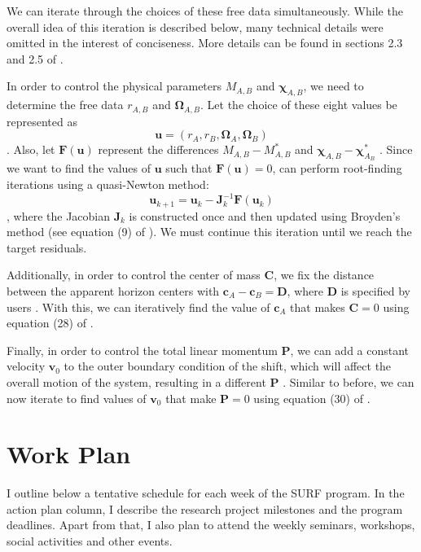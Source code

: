 \documentclass{../letter}
\renewcommand{\v}[1]{\boldsymbol{#1}}
\begin{document}
	We can iterate through the choices of these free data simultaneously. While the overall idea of this iteration is described below, many technical details were omitted in the interest of conciseness. More details can be found in sections 2.3 and 2.5 of \cite{Serguei}.

	In order to control the physical parameters $M_{A,B}$ and $\v\chi_{A,B}$, we need to determine the free data $r_{A,B}$ and $\v\Omega_{A,B}$. Let the choice of these eight values be represented as
	\begin{equation}
		\v u = (r_A, r_B, \v\Omega_A, \v\Omega_B)
	\end{equation}
	\cite{Serguei}. Also, let $\v F(\v u)$ represent the differences $M_{A,B} - M_{A,B}^*$ and $\v \chi_{A,B} - \v \chi_{A_B}^*$ \cite{Serguei}. Since we want to find the values of $\v u$ such that $\v F(\v u) = 0$, can perform root-finding iterations using a quasi-Newton method:
	\begin{equation}
		\v u_{k+1} = \v u_k - \v J_k^{-1} \v F(\v u_k)
	\end{equation}
	\cite{Serguei}, where the Jacobian $\v J_k$ is constructed once and then updated using Broyden's method (see equation (9) of \cite{Serguei}). We must continue this iteration until we reach the target residuals.

	Additionally, in order to control the center of mass $\v C$, we fix the distance between the apparent horizon centers with $\v c_A - \v c_B = \v D$, where $\v D$ is specified by users \cite{Serguei}. With this, we can iteratively find the value of $\v c_A$ that makes $\v C = 0$ using equation (28) of \cite{Serguei}.

	Finally, in order to control the total linear momentum $\v P$, we can add a constant velocity $\v v_0$ to the outer boundary condition of the shift, which will affect the overall motion of the system, resulting in a different $\v P$ \cite{Serguei}. Similar to before, we can now iterate to find values of $\v v_0$ that make $\v P = 0$ using equation (30) of \cite{Serguei}.

	\section{Work Plan}

	I outline below a tentative schedule for each week of the SURF program. In the action plan column, I describe the research project milestones and the program deadlines. Apart from that, I also plan to attend the weekly seminars, workshops, social activities and other events.
\end{document}
